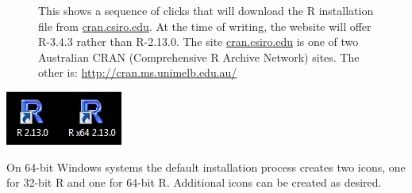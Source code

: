 \documentclass{tufte-book}\usepackage[]{graphicx}\usepackage[]{color}
\begin{document}
\begin{figure}
\vspace*{2pt}

\vspace*{2pt}

\caption{This shows a sequence of clicks that will download
  the R installation file from \url{cran.csiro.edu}. At the time of writing,
  the website will offer R-3.4.3 rather than R-2.13.0. The site
  \url{cran.csiro.edu} is one of two Australian CRAN (Comprehensive R Archive
  Network) sites. The other is:
  \url{http://cran.ms.unimelb.edu.au/}}
\end{figure}

\begin{marginfigure}
\begin{center}
\begin{minipage}[c]{0.8\textwidth}
\includegraphics{figs-inc/01i-icons.jpg}
\end{minipage}
\end{center}
\caption{On 64-bit Windows systems the default installation
process creates two icons, one for 32-bit R and one for 64-bit R.
Additional icons can be created as desired.
}
\end{marginfigure}
\end{document}
